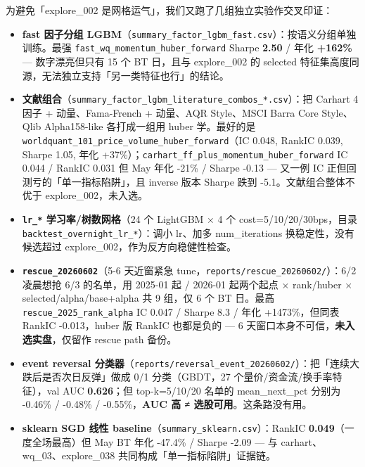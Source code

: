 \documentclass[
  fontset=fandol]{ctexart}
\providecommand{\tightlist}{%
  \setlength{\itemsep}{0pt}\setlength{\parskip}{0pt}}
\begin{document}
为避免「explore\_002
是网格运气」，我们又跑了几组独立实验作交叉印证：

\begin{itemize}
\tightlist
\item
  \textbf{fast 因子分组
  LGBM}（\texttt{summary\_factor\_lgbm\_fast.csv}）：按语义分组单独训练。最强
  \texttt{fast\_wq\_momentum\_huber\_forward}
  Sharpe \textbf{2.50} / 年化
  \textbf{+162\%} --- 数字漂亮但只有 15
  个 BT 日，且与 explore\_002 的
  selected
  特征集高度同源，无法独立支持「另一类特征也行」的结论。
\item
  \textbf{文献组合}（\texttt{summary\_factor\_lgbm\_literature\_combos\_*.csv}）：把
  Carhart 4 因子 + 动量、Fama-French +
  动量、AQR Style、MSCI Barra Core
  Style、Qlib Alpha158-like 各打成一组用
  huber 学。最好的是
  \texttt{worldquant\_101\_price\_volume\_huber\_forward}（IC
  0.048, RankIC 0.039, Sharpe 1.05, 年化
  +37\%）；\texttt{carhart\_ff\_plus\_momentum\_huber\_forward}
  IC 0.044 / RankIC 0.031 但 May 年化
  -21\% / Sharpe -0.13 --- 又一例 IC
  正但回测亏的「单一指标陷阱」，且
  inverse 版本 Sharpe 跌到
  -5.1。文献组合整体不优于
  explore\_002，未入选。
\item
  \textbf{\texttt{lr\_*}
  学习率/树数网格}（24 个 LightGBM × 4
  个 cost=5/10/20/30bps，目录
  \texttt{backtest\_overnight\_lr\_*}）：调小
  lr、加多 num\_iterations
  换稳定性，没有候选超过
  explore\_002，作为反方向稳健性检查。
\item
  \textbf{\texttt{rescue\_20260602}}（5-6
  天近窗紧急
  tune，\texttt{reports/rescue\_20260602/}）：6/2
  凌晨想抢 6/3 的名单，用 2025-01 起 /
  2026-01 起两个起点 × rank/huber ×
  selected/alpha/base+alpha 共 9 组，仅
  6 个 BT 日。最高
  \texttt{rescue\_2025\_rank\_alpha} IC
  0.047 / Sharpe 8.3 / 年化
  +1473\%，但同表 RankIC -0.013，huber
  版 RankIC 也都是负的 --- 6
  天窗口本身不可信，\textbf{未入选实盘}，仅留作
  rescue path 备份。
\item
  \textbf{event reversal
  分类器}（\texttt{reports/reversal\_event\_20260602/}）：把「连续大跌后是否次日反弹」做成
  0/1 分类（GBDT，27
  个量价/资金流/换手率特征），val AUC
  \textbf{0.626}；但 top-k=5/10/20
  名单的 mean\_next\_pct 分别为 -0.46\%
  / -0.48\% / -0.55\%，\textbf{AUC 高 ≠
  选股可用}。这条路没有用。
\item
  \textbf{sklearn SGD 线性
  baseline}（\texttt{summary\_sklearn.csv}）：RankIC
  \textbf{0.049}（一度全场最高）但 May
  BT 年化 -47.4\% / Sharpe -2.09 --- 与
  carhart、wq\_03、explore\_038
  共同构成「单一指标陷阱」证据链。
\end{itemize}
\end{document}
